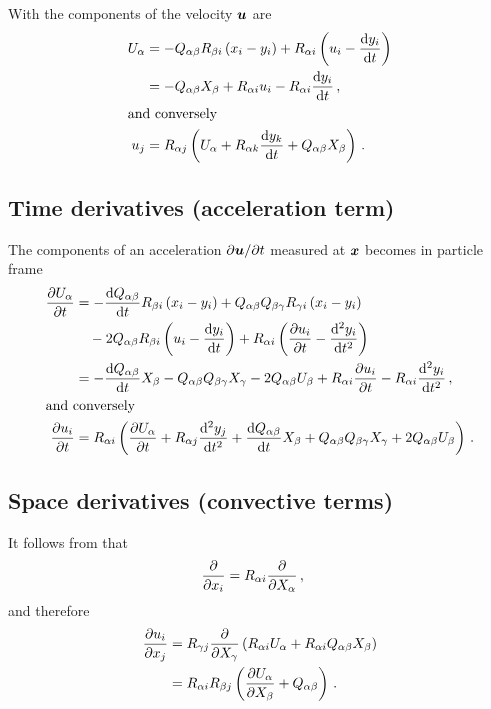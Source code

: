 \documentclass[thesis.tex]{subfiles}
\begin{document}
With  the components of the velocity $\mbox{\boldmath$u$}$ are
\begin{align}
    U_\alpha &= -Q_{\alpha \beta}R_{\beta i}\left(x_i - y_i\right) + R_{\alpha i}\left(u_i - \diff{y_i}{t}\right) \nn \\
    &= -Q_{\alpha \beta}X_\beta + R_{\alpha i}u_i - R_{\alpha i}\diff{y_i}{t}\,,\nn\\
    \intertext{and conversely}
    u_j &= R_{\alpha j}\left(U_\alpha + R_{\alpha k}\diff{y_k}{t} + Q_{\alpha \beta}X_\beta\right)\,.
    \eqnlab{u}
\end{align}
\subsection{Time derivatives (acceleration term)}
The components of an acceleration $\partial \mbox{\boldmath$u$}/\partial t$ measured at $\mbox{\boldmath$x$}$ becomes in particle frame
\begin{align}
    \pdiff{U_\alpha}{t} &= -\diff{Q_{\alpha \beta}}{t}R_{\beta i}\left(x_i - y_i\right) + Q_{\alpha \beta}Q_{\beta \gamma}R_{\gamma i}\left(x_i - y_i\right) \nn\\
    &\quad- 2Q_{\alpha \beta}R_{\beta i}\left(u_i - \diff{y_i}{t}\right) + R_{\alpha i}\left(\pdiff{u_i}{t} - \frac{\rd^2 y_i}{\rd t^2}\right) \nn \\
    &= -\diff{Q_{\alpha \beta}}{t}X_\beta - Q_{\alpha \beta}Q_{\beta \gamma}X_\gamma - 2Q_{\alpha \beta}U_\beta + R_{\alpha i}\pdiff{u_i}{t} -R_{\alpha i}\frac{\rd^2 y_i}{\rd t^2}\,,\\
    \intertext{and conversely}
    \pdiff{u_i}{t} &= R_{\alpha i}\left(\pdiff{U_\alpha}{t} + R_{\alpha j}\frac{\rd^2y_j}{\rd t^2} + \diff{Q_{\alpha \beta}}{t}X_\beta + Q_{\alpha \beta}Q_{\beta \gamma}X_\gamma + 2Q_{\alpha \beta}U_\beta \right)\,.
    \eqnlab{partialu}
\end{align}
\subsection{Space derivatives (convective terms)}
It follows from  that
\begin{align}
 	\frac{\partial }{\partial x_i} &= R_{\alpha i}\frac{\partial }{\partial X_\alpha}\,, 
 \end{align} 
 and therefore
 \begin{align}
 	\pdiff{u_i}{x_j} &= R_{\gamma j}\pdiff{}{X_\gamma}\left(R_{\alpha i}U_\alpha + R_{\alpha i}Q_{\alpha \beta}X_\beta\right) \nn\\
 	&= R_{\alpha i}R_{\beta j}\left(\pdiff{U_\alpha}{X_\beta}+Q_{\alpha \beta}\right)\,.\eqnlab{dudx}
 \end{align}
\end{document}
